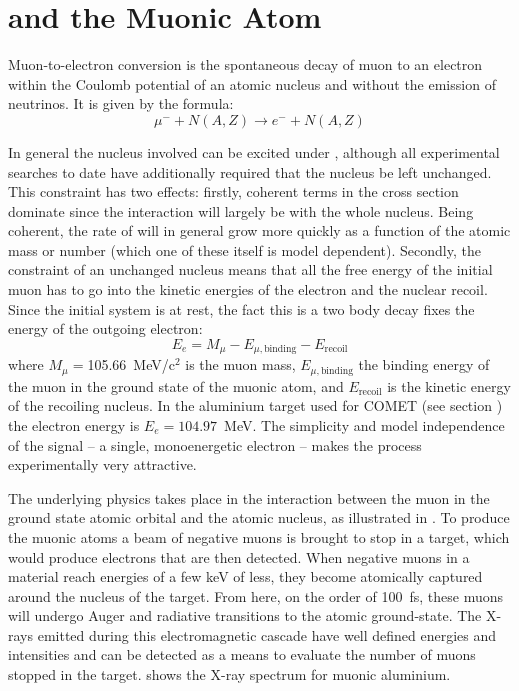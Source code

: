 
\chapter{\mueconv and the Muonic Atom}
Muon-to-electron conversion is the spontaneous decay of  muon to an electron within the Coulomb potential of an atomic nucleus and without the emission of neutrinos.
It is given by the formula:
\begin{equation}
\mu^{-}+N(A,Z) \rightarrow e^{-}+N(A,Z)
\end{equation}

\FigMuecCreation
In general the nucleus involved can be excited under \mueconv, although all experimental searches to date have additionally required that the nucleus be left unchanged.
This constraint has two effects: firstly, coherent terms in the \mueconv cross section dominate since the interaction will largely be with the whole nucleus.
Being coherent, the rate of \mueconv will in general grow more quickly as a function of the atomic mass or number (which one of these itself is model dependent).
Secondly, the constraint of an unchanged nucleus means that all the free energy of the initial muon has to go into the kinetic energies of the electron and the nuclear recoil.
Since the initial system is at rest, the fact this is a two body decay fixes the energy of the outgoing electron:
\begin{equation}
E_e=M_\mu-E_{\mu,\mathrm{binding}}-E_\mathrm{recoil}
\end{equation}
where $M_\mu=$105.66~MeV/c$^2$ is the muon mass, $E_{\mu,\mathrm{binding}}$ the
binding energy of the muon in the ground state of the muonic atom, and
$E_\mathrm{recoil}$ is the kinetic energy of the recoiling nucleus.
In the aluminium target used for COMET (see section ) the electron energy is $E_e=104.97$~MeV.
The simplicity and model independence of the signal -- a single, monoenergetic electron -- makes the process experimentally very attractive.

The underlying physics takes place in the interaction between the muon in the ground state atomic orbital and the atomic nucleus, as illustrated in .
To produce the muonic atoms a beam of negative muons is brought to stop in a target, which would produce electrons that are then detected.
When negative muons in a material reach energies of a few keV of less, they become atomically captured around the nucleus of the target.
From here, on the order of 100~fs, these muons will undergo Auger and radiative transitions to the atomic ground-state.
The X-rays emitted during this electromagnetic cascade have well defined energies and intensities and can be detected as a means to evaluate the number of muons stopped in the target.
 shows the X-ray spectrum for muonic aluminium.

